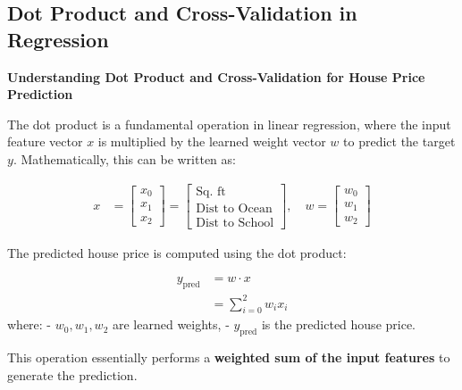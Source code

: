 \subsection{Dot Product and Cross-Validation in Regression}

\begin{center}
    \textbf{Understanding Dot Product and Cross-Validation for House Price Prediction}
\end{center}

\vspace{-0.5cm}

The dot product is a fundamental operation in linear regression, where the input feature vector \( x \) is multiplied by the learned weight vector \( w \) to predict the target \( y \). Mathematically, this can be written as:

\begin{align*}
    x &= \begin{bmatrix}
            x_0 \\ x_1 \\ x_2
         \end{bmatrix} =
         \begin{bmatrix}
            \text{Sq. ft} \\
            \text{Dist to Ocean} \\
            \text{Dist to School}
         \end{bmatrix}, \quad
    w = \begin{bmatrix}
            w_0 \\ w_1 \\ w_2
         \end{bmatrix}
\end{align*}

The predicted house price is computed using the dot product:

\begin{align*}
    y_{\text{pred}} &= w \cdot x \\
    &= \sum_{i=0}^{2} w_i x_i
\end{align*}
where:
- \( w_0, w_1, w_2 \) are learned weights,
- \( y_{\text{pred}} \) is the predicted house price.

This operation essentially performs a \textbf{weighted sum of the input features} to generate the prediction.


